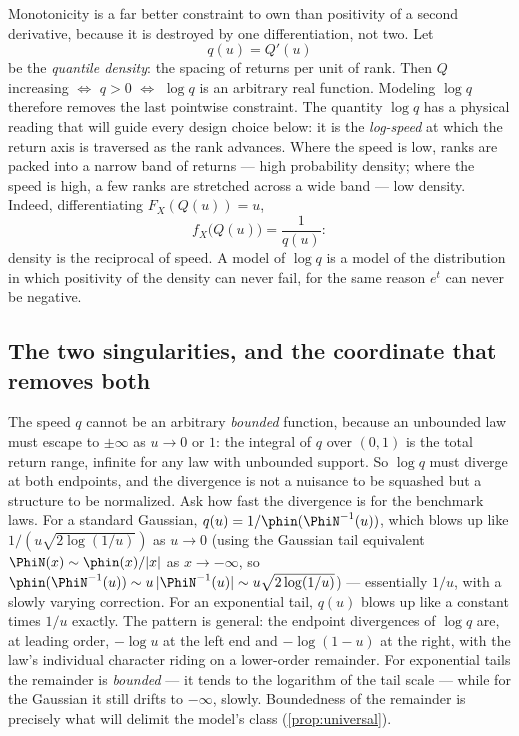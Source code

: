 Monotonicity is a far better constraint to own than positivity of a second
derivative, because it is destroyed by one differentiation, not two.  Let
\begin{equation}
q(u)=Q'(u)
\label{eq:qdef}
\end{equation}
be the \emph{quantile density}: the spacing of returns per unit of rank.
Then $Q$ increasing $\iff$ $q>0$ $\iff$ $\log q$ is an arbitrary real
function.  Modeling $\log q$ therefore removes the last pointwise
constraint.  The quantity $\log q$ has a physical reading that will guide
every design choice below: it is the \emph{log-speed} at which the return
axis is traversed as the rank advances.  Where the speed is low, ranks are
packed into a narrow band of returns --- high probability density; where
the speed is high, a few ranks are stretched across a wide band ---
low density.  Indeed, differentiating $F_X(Q(u))=u$,
\begin{equation}
f_X\big(Q(u)\big)=\frac{1}{q(u)} :
\label{eq:reciprocal}
\end{equation}
density is the reciprocal of speed.  A model of $\log q$ is a model of the
distribution in which positivity of the density can never fail, for the
same reason $e^{t}$ can never be negative.

\subsection{The two singularities, and the coordinate that removes both}

The speed $q$ cannot be an arbitrary \emph{bounded} function, because an
unbounded law must escape to $\pm\infty$ as $u\to0$ or $1$: the integral of
$q$ over $(0,1)$ is the total return range, infinite for any law with
unbounded support.  So $\log q$ must diverge at both endpoints, and the
divergence is not a nuisance to be squashed but a structure to be
normalized.  Ask how fast the divergence is for the benchmark laws.  For a
standard Gaussian, $q(u)=1/\phin(\PhiN^{-1}(u))$, which blows up like
$1/(u\sqrt{2\log(1/u)})$ as $u\to0$ (using the Gaussian tail equivalent
$\PhiN(x)\sim\phin(x)/|x|$ as $x\to-\infty$, so
$\phin(\PhiN^{-1}(u))\sim u\,|\PhiN^{-1}(u)|\sim u\sqrt{2\log(1/u)}$) ---
essentially $1/u$, with a slowly varying correction.  For an exponential tail, $q(u)$ blows up like a
constant times $1/u$ exactly.  The pattern is general: the endpoint
divergences of $\log q$ are, at leading order, $-\log u$ at the left end
and $-\log(1-u)$ at the right, with the law's individual character riding
on a lower-order remainder.  For exponential tails the remainder is
\emph{bounded} --- it tends to the logarithm of the tail scale --- while
for the Gaussian it still drifts to $-\infty$, slowly.  Boundedness of the
remainder is precisely what will delimit the model's class
(\cref{prop:universal}).

